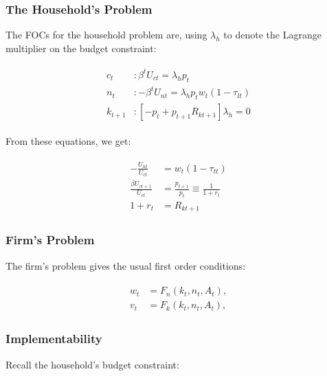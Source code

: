 \documentclass[10pt]{article}
\begin{document}
\subsubsection{The Household's Problem}

The FOCs for the household problem are,
using $\lambda_h$ to denote the Lagrange multiplier on the budget constraint:

\begin{align}
    \begin{aligned}
        c_t & : \beta^t U_{c t}=\lambda_h p_t \\
        n_t & :-\beta^t U_{n t}=\lambda_h p_t w_t\left(1-\tau_{l t}\right) \\
        k_{t+1} & :\left[-p_t+p_{t+1} R_{k t+1}\right] \lambda_h=0
        \end{aligned}
\end{align}

From these equations, we get:

\begin{align}
    \begin{aligned}
        -\frac{U_{n t}}{U_{c t}} & =w_t\left(1-\tau_{t t}\right) \\
        \frac{\beta U_{c t+1}}{U_{c t}} & =\frac{p_{t+1}}{p_t} \equiv \frac{1}{1+r_t} \\
        1+r_t & =R_{k t+1}
        \end{aligned}
\end{align}

\subsubsection{Firm's Problem}

The firm's problem gives the usual first order conditions:

\begin{align}
    \begin{aligned}
        w_t & =F_n\left(k_t, n_t, A_t\right), \\
        v_t & =F_k\left(k_t, n_t, A_t\right),
        \end{aligned}
\end{align}

\subsubsection{Implementability}

Recall the household's budget constraint:
\end{document}
